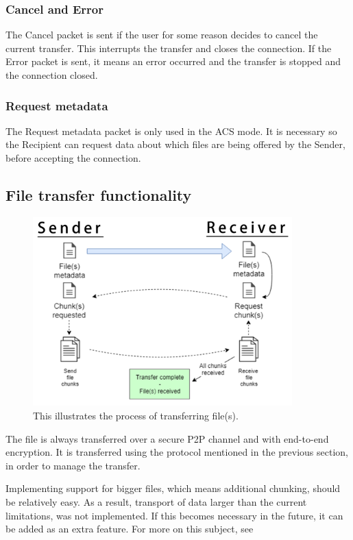 	\subsubsection*{Cancel and Error}
	The Cancel packet is sent if the user for some reason decides to cancel the current transfer. This interrupts the transfer and closes the connection. If the Error packet is sent, it means an error occurred and the transfer is stopped and the connection closed.

	\subsubsection*{Request metadata}
	The Request metadata packet is only used in the ACS mode. It is necessary so the Recipient can request data about which files are being offered by the Sender, before accepting the connection. 

	\subsection{File transfer functionality}
		\begin{figure}[th]
		  \centering
		  \includegraphics[width=100mm]{Figures/File_share_protocol}
		  \decoRule
		  \caption[File sharing process]{This illustrates the process of transferring file(s).}
		  \label{fig:file_off}
		\end{figure}

		The file is always transferred over a secure P2P channel and with end-to-end encryption. It is transferred using the protocol mentioned in the previous section, in order to manage the transfer.

		Implementing support for bigger files, which means additional chunking, should be relatively easy. As a result, transport of data larger than the current limitations, was not implemented. If this becomes necessary in the future, it can be added as an extra feature. For more on this subject, see 
		
